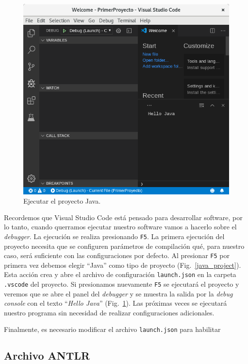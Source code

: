 \documentclass[a5paper,10pt]{article}
\begin{document}
\begin{figure}[t]
	\centering
	\includegraphics[width=.95\textwidth]{PrimeraEjecucion}
	\caption{Ejecutar el proyecto Java.}
	\label{hello_java}
\end{figure}


Recordemos que Visual Studio Code está pensado para desarrollar software, por lo tanto, cuando querramos ejecutar nuestro software vamos a hacerlo sobre el \emph{debugger}.  La ejecución se realiza presionando \verb|F5|.  La primera ejecución del proyecto necesita que se configuren parámetros de compilación qué, para nuestro caso, será suficiente con las configuraciones por defecto.  Al presionar \verb|F5| por primera vez debemos elegir ``Java'' como tipo de proyecto  (Fig.~\ref{java_project}).  Esta acción crea y abre el archivo de configuración \verb|launch.json| en la carpeta \verb|.vscode| del proyecto.  Si presionamos nuevamente \verb|F5| se ejecutará el proyecto y veremos que se abre el panel del \emph{debugger} y se muestra la salida por la \emph{debug console} con el texto ``\emph{Hello Java}'' (Fig.~\ref{hello_java}).  Las próximas veces se ejecutará nuestro programa sin necesidad de realizar configuraciones adicionales.

Finalmente, es necesario modificar el archivo \verb|launch.json| para habilitar 


\subsection{Archivo ANTLR}
\label{archivo_antlr}
\end{document}
